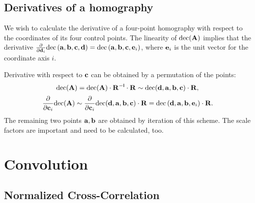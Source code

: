 \subsection{Derivatives of a homography}

We wish to calculate the derivative of a four-point homography with respect to the coordinates of its four control points.
The linearity of $\mathrm{dec}(\mathbf{A})$ implies that the derivative $\frac{\partial} {\partial \mathbf{d}_i} \mathrm{dec} \left( \mathbf{a}, \mathbf{b}, \mathbf{c}, \mathbf{d} \right) = \mathrm{dec} \left( \mathbf{a}, \mathbf{b}, \mathbf{c}, \mathbf{e}_i \right)$, where $\mathbf{e}_i$ is the unit vector for the coordinate axis $i$.

Derivative with respect to $\mathbf{c}$ can be obtained by a permutation of the points:
$$\mathrm{dec}(\mathbf{A}) = \mathrm{dec}(\mathbf{A}) \cdot \mathbf{R}^{-\mathsf{I}} \cdot \mathbf{R} \sim \mathrm{dec}(\mathbf{d}, \mathbf{a}, \mathbf{b}, \mathbf{c}) \cdot \mathbf{R},$$
$$\frac{\partial} {\partial \mathbf{c}_i} \mathrm{dec}(\mathbf{A}) \sim \frac{\partial} {\partial \mathbf{c}_i} \mathrm{dec}(\mathbf{d}, \mathbf{a}, \mathbf{b}, \mathbf{c}) \cdot \mathbf{R} = \mathrm{dec} \left( \mathbf{d}, \mathbf{a}, \mathbf{b}, \mathbf{e}_i \right) \cdot \mathbf{R}.$$
The remaining two points $\mathbf{a}, \mathbf{b}$ are obtained by iteration of this scheme.
The scale factors are important and need to be calculated, too.


\section{Convolution}

\subsection{Normalized Cross-Correlation}



